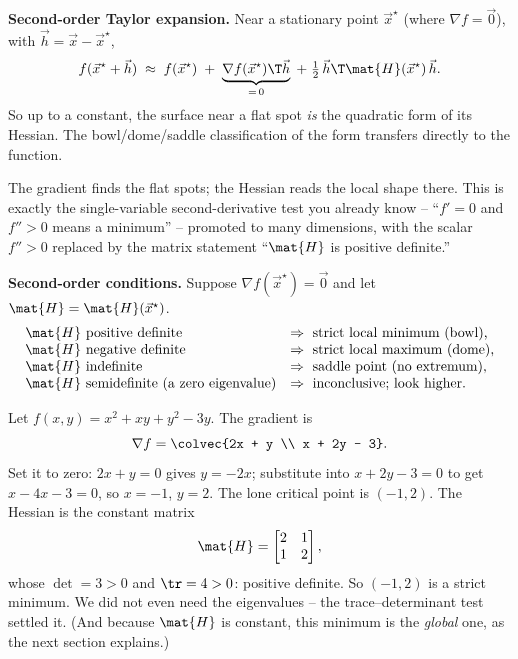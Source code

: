 \begin{formalbox}
\label{ch36:thm-taylor}
\textbf{Second-order Taylor expansion.} Near a stationary point $\vec{x}^\star$ (where $\nabla f=\vec{0}$), with
$\vec{h}=\vec{x}-\vec{x}^\star$,
\[
  f(\vec{x}^\star+\vec{h}) \;\approx\; f(\vec{x}^\star) \;+\; \underbrace{\nabla f(\vec{x}^\star)\T\vec{h}}_{=\,0}
  \;+\; \tfrac12\,\vec{h}\T\mat{H}(\vec{x}^\star)\,\vec{h}.
\]
So up to a constant, the surface near a flat spot \emph{is} the quadratic form of its
Hessian. The bowl/dome/saddle classification of the form transfers directly to the
function.
\end{formalbox}

\begin{intuitionbox}
The gradient finds the flat spots; the Hessian reads the local shape there. This is
exactly the single-variable second-derivative test you already know -- ``$f'=0$ and
$f''>0$ means a minimum'' -- promoted to many dimensions, with the scalar $f''>0$
replaced by the matrix statement ``$\mat{H}$ is positive definite.''
\end{intuitionbox}

\begin{formalbox}
\label{ch36:thm-second-order}
\textbf{Second-order conditions.} Suppose $\nabla f(\vec{x}^\star)=\vec{0}$ and let $\mat{H}=\mat{H}(\vec{x}^\star)$.
\[
\begin{array}{ll}
\mat{H} \text{ positive definite} & \Rightarrow\ \text{strict local minimum (bowl),}\\
\mat{H} \text{ negative definite} & \Rightarrow\ \text{strict local maximum (dome),}\\
\mat{H} \text{ indefinite} & \Rightarrow\ \text{saddle point (no extremum),}\\
\mat{H} \text{ semidefinite (a zero eigenvalue)} & \Rightarrow\ \text{inconclusive; look higher.}
\end{array}
\]
\end{formalbox}

\begin{example}
\label{ch36:ex-critical}
Let $f(x,y) = x^2 + xy + y^2 - 3y$. The gradient is
\[
  \nabla f = \colvec{2x + y \\ x + 2y - 3}.
\]
Set it to zero: $2x+y=0$ gives $y=-2x$; substitute into $x+2y-3=0$ to get
$x-4x-3=0$, so $x=-1$, $y=2$. The lone critical point is $(-1,2)$. The Hessian is the
constant matrix
\[
  \mat{H} = \begin{bmatrix} 2 & 1 \\ 1 & 2 \end{bmatrix},
\]
whose $\det=3>0$ and $\tr=4>0$: positive definite. So $(-1,2)$ is a strict minimum.
We did not even need the eigenvalues -- the trace--determinant test settled it. (And
because $\mat{H}$ is constant, this minimum is the \emph{global} one, as the next
section explains.)
\end{example}

